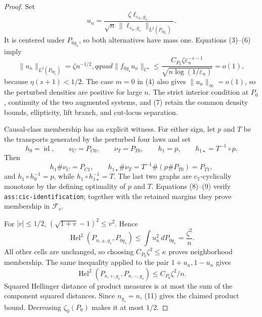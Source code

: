 \documentclass{article}
\begin{document}
\begin{proof}
Set
\[
 u_n=\frac{\zeta\ell_{\varepsilon_n,g_\star}}
 {\sqrt n\,\|\ell_{\varepsilon_n,g_\star}\|_{L^2(P_{0g_\star})}}. \tag{6}
\]
It is centered under \(P_{0g_\star}\), so both alternatives have mass one.  Equations (3)--(6) imply
\[
 \|u_n\|_{L^2(P_{0g_\star})}=\zeta n^{-1/2},qquad
 \|f_{0g_\star}u_n\|_{C^s}
 \leq\frac{C_{P_0}\zeta\varepsilon_n^{-s-1}}
 {\sqrt{n\log(1/\varepsilon_n)}}=o(1),                                \tag{7}
\]
because \(\eta(s+1)<1/2\).  The case \(m=0\) in (4) also gives \(\|u_n\|_\infty=o(1)\), so the perturbed densities are positive for large \(n\).  The strict interior condition at \(P_0\), continuity of the two augmented systems, and (7) retain the common density bounds, ellipticity, lift branch, and cut-locus separation.

Causal-class membership has an explicit witness.  For either sign, let \(p\) and \(T\) be the transports generated by the perturbed four laws and set
\[
 h_0=\operatorname{id},\qquad \nu_C=P_{C0},\qquad \nu_T=P_{T0},
 \qquad h_1=p,\qquad h_{1\star}=T^{-1}\circ p.                        \tag{8}
\]
Then
\[
 h_1\#\nu_C=P_{C1},\qquad
 h_{1\star}\#\nu_T=T^{-1}\#(p\#P_{T0})=P_{T1},                      \tag{9}
\]
and \(h_1\circ h_0^{-1}=p\), while
\(h_1\circ h_{1\star}^{-1}=T\).  The last two graphs are
\(c_{\mathbb T}\)-cyclically monotone by the defining optimality of \(p\) and \(T\).  Equations (8)--(9) verify \texttt{ass:cic-identification}; together with the retained margins they prove membership in \(\mathcal F_s\).

For \(|v|\leq1/2\), \((\sqrt{1+v}-1)^2\leq v^2\).  Hence
\[
 \operatorname{Hel}^2(P_{n,\pm,g_\star},P_{0g_\star})
 \leq\int u_n^2\,dP_{0g_\star}=\frac{\zeta^2}{n}.                   \tag{10}
\]
All other cells are unchanged, so choosing \(C_{P_0}\zeta^2\leq\kappa\) proves neighborhood membership.  The same inequality applied to the pair \(1+u_n,1-u_n\) gives
\[
 \operatorname{Hel}^2(P_{n,+,g_\star},P_{n,-,g_\star})
 \leq C_{P_0}\zeta^2/n.                                               \tag{11}
\]
Squared Hellinger distance of product measures is at most the sum of the component squared distances.  Since \(n_{g_\star}=n\), (11) gives the claimed product bound.  Decreasing \(\zeta_0(P_0)\) makes it at most \(1/2\).


\end{proof}
\end{document}
